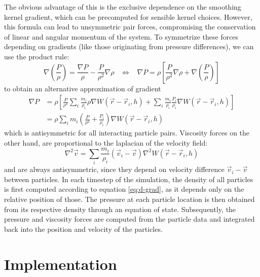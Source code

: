 \documentclass{llncs}
\begin{document}
The obvious advantage of this is the exclusive dependence on the smoothing kernel
gradient, which can be precomputed for sensible kernel choices. However, this formula can
lead to unsymmetric pair forces, compromising the conservation of linear and angular
momentum of the system. To symmetrize these forces depending on gradients (like those
originating from pressure differences), we can use the product rule:
\begin{equation*}
  \label{eq:grad-identity}
  \nabla \left( \frac{P}{\rho} \right) =
  \frac{\nabla P}{\rho}-
  \frac{P}{\rho^2} \nabla \rho
  \hspace{10pt} \Leftrightarrow \hspace{10pt}
  \nabla P = \rho \left[ \frac{P}{\rho^2} \nabla \rho + \nabla \left( \frac{P}{\rho}
    \right) \right]
\end{equation*}
to obtain an alternative approximation of gradient
\begin{align}
  \label{eq:grad-est}
  \nabla P & = \rho \left[ \frac{P}{\rho^2} \sum_i \frac{m_i}{\rho_i} \rho \nabla
             W(\vec{r}-\vec{r}_i, h)
             +
             \sum_i \frac{m_i}{\rho_i} \frac{P_i}{\rho_i} \nabla W(\vec{r}-\vec{r}_i, h)
             \right] \nonumber \\
           & = \rho \sum_i m_i \left(\frac{P}{\rho^2} + \frac{P_i}{\rho_i} \right)
             \nabla W(\vec{r}-\vec{r}_i, h)
\end{align}
which is antisymmetric for all interacting particle pairs. Viscosity forces on the other
hand, are proportional to the laplacian of the velocity field:
\begin{equation}
  \label{eq:lapl-est}
  \nabla^2\vec{v} = \sum_i \frac{m_i}{\rho_i} (\vec{v}_i - \vec{v}) \nabla^2
  W(\vec{r}-\vec{r}_i, h)
\end{equation}
and are always antisymmetric, since they depend on velocity difference
$\vec{v}_i - \vec{v}$ between particles.  In each timestep of the simulation, the density
of all particles is first computed according to equation \ref{eq:d-grad}, as it depends
only on the relative position of those. The pressure at each particle location is then
obtained from its respective density through an equation of state. Subsequently, the
pressure and viscosity forces are computed from the particle data and integrated back into
the position and velocity of the particles.

\section{Implementation}
\end{document}
